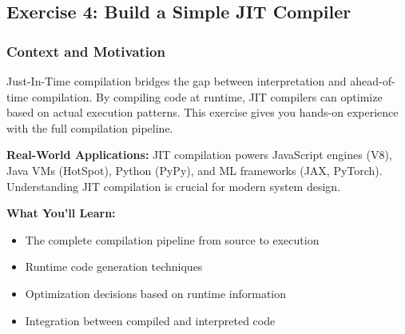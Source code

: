 \documentclass[11pt,a4paper]{article}
\begin{document}
\subsection{Exercise 4: Build a Simple JIT Compiler}

\subsubsection{Context and Motivation}

Just-In-Time compilation bridges the gap between interpretation and ahead-of-time compilation. By compiling code at runtime, JIT compilers can optimize based on actual execution patterns. This exercise gives you hands-on experience with the full compilation pipeline.

\textbf{Real-World Applications:} JIT compilation powers JavaScript engines (V8), Java VMs (HotSpot), Python (PyPy), and ML frameworks (JAX, PyTorch). Understanding JIT compilation is crucial for modern system design.

\textbf{What You'll Learn:}
\begin{itemize}
    \item The complete compilation pipeline from source to execution
    \item Runtime code generation techniques
    \item Optimization decisions based on runtime information
    \item Integration between compiled and interpreted code
\end{itemize}
\end{document}
